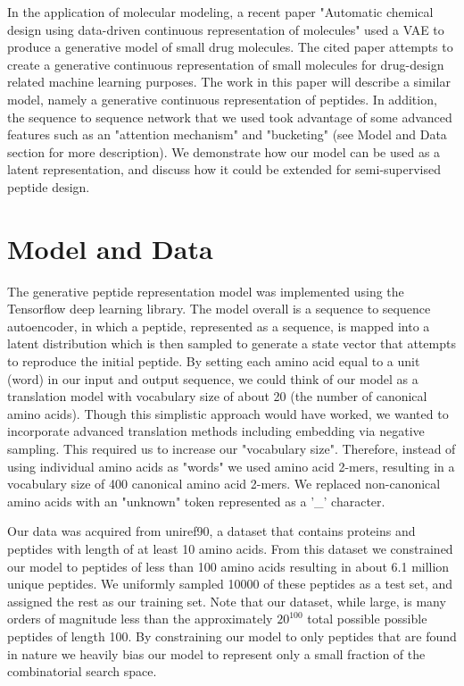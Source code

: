 \documentclass[final,1p,times,twocolumn]{elsarticle}
\begin{document}
In the application of molecular modeling, a recent paper "Automatic chemical design using data-driven continuous representation of molecules"\cite{gomez2016automatic} used a VAE to produce a generative model of small drug molecules. The cited paper attempts to create a generative continuous representation of small molecules for drug-design related machine learning purposes. The work in this paper will describe a similar model, namely a generative continuous representation of peptides. In addition, the sequence to sequence network that we used took advantage of some advanced features such as an "attention mechanism" and "bucketing" (see Model and Data section for more description). We demonstrate how our model can be used as a latent representation, and discuss how it could be extended for semi-supervised peptide design.

\section{Model and Data}

The generative peptide representation model was implemented using the Tensorflow deep learning library\cite{tensorflow2015-whitepaper}. The model overall is a sequence to sequence autoencoder, in which a peptide, represented as a sequence, is mapped into a latent distribution which is then sampled to generate a state vector that attempts to reproduce the initial peptide. By setting each amino acid equal to a unit (word) in our input and output sequence, we could think of our model as a translation model with vocabulary size of about 20 (the number of canonical amino acids). Though this simplistic approach would have worked, we wanted to incorporate advanced translation methods including embedding via negative sampling. This required us to increase our "vocabulary size". Therefore, instead of using individual amino acids as "words" we used amino acid 2-mers, resulting in a vocabulary size of 400 canonical amino acid 2-mers. We replaced non-canonical amino acids with an "unknown" token represented as a '\_' character.

Our data was acquired from uniref90, a dataset that contains proteins and peptides with length of at least 10 amino acids. From this dataset we constrained our model to peptides of less than 100 amino acids resulting in about 6.1 million unique peptides. We uniformly sampled 10000 of these peptides as a test set, and assigned the rest as our training set. Note that our dataset, while large, is many orders of magnitude less than the approximately $20^{100}$ total possible possible peptides of length 100. By constraining our model to only peptides that are found in nature we heavily bias our model to represent only a small fraction of the combinatorial search space.
\end{document}
